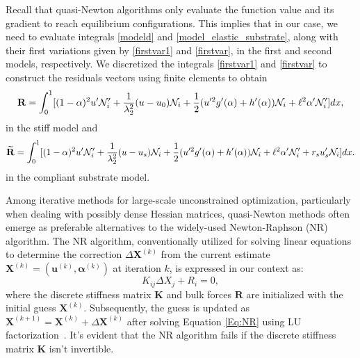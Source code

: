 Recall that quasi-Newton algorithms only evaluate the function value and its gradient to reach equilibrium configurations. This implies that in our case, we need to evaluate integrals \eqref{modeld} and \eqref{model_elastic_substrate}, along with their first variations given by \eqref{firstvar1} and \eqref{firstvar}, in the first and second models, respectively. We   discretized the integrals \eqref{firstvar1} and \eqref{firstvar} to construct the residuals vectors using finite elements to obtain 
\begin{equation}
    {\bf R} =
     \int_0^1 [(1-\alpha)^2u'\mathcal{N}'_i+\frac{1}{\lambda_2^2} (u-u_0) \mathcal{N}_i+\frac{1}{2}(u'^2 g'(\alpha)+h'(\alpha))\mathcal{N}_i+\ell^2\alpha'\mathcal{N}'_i ]dx,\label{residual1}
\end{equation}
in the stiff model and 
\begin{equation}
    \widetilde{{\bf R}}= 
    \int_0^1 [(1-\alpha)^2u'\mathcal{N}'_i+\frac{1}{\lambda_2^2} (u-u_s) \mathcal{N}_i+\frac{1}{2}(u'^2 g'(\alpha)+h'(\alpha))\mathcal{N}_i+\ell^2\alpha'\mathcal{N}'_i +r_su_s'\mathcal{N}_i]dx\label{residual2}.
\end{equation}
in the compliant substrate model. 

Among iterative methods for large-scale unconstrained optimization, particularly when dealing with possibly dense Hessian matrices,  quasi-Newton methods often emerge as preferable alternatives to the widely-used Newton-Raphson (NR) algorithm. The NR algorithm, conventionally utilized for solving linear equations to determine the correction $\Delta \mathbf{X}^{(k)}$ from the current estimate $\mathbf{X}^{(k)} = (\mathbf{u}^{(k)}, \boldsymbol{\alpha}^{(k)})$ at iteration $k$, is expressed in our context as:
\begin{equation}
K_{ij} \Delta X_j + R_i = 0,
\label{Eq:NR}
\end{equation}
where the discrete stiffness matrix $\mathbf{K}$ and bulk forces $\mathbf{R}$ are initialized with the initial guess $\mathbf{X}^{(k)}$. Subsequently, the guess is updated as $\mathbf{X}^{(k+1)} = \mathbf{X}^{(k)} + \Delta \mathbf{X}^{(k)}$ after solving Equation \eqref{Eq:NR} using LU factorization~\cite{Sanderson2016-ht}. It's evident that the NR algorithm fails if the discrete stiffness matrix $\mathbf{K}$ isn't invertible.

